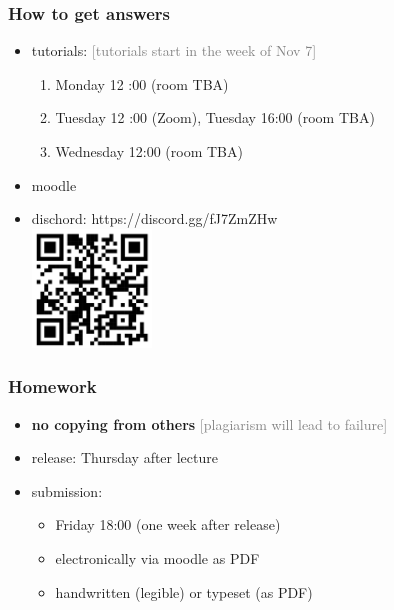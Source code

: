 \documentclass[fleqn,10pt,serif,xcolor=svgnames,xcolor=table,aspectratio=169,handout]{beamer}
\newcommand{\mycom}[1]{\hfill {\mygray{[#1]}}}
\newcommand{\mygray}[1]{\textcolor{gray}{#1}}
\begin{document}
\begin{frame}
  \frametitle{How to get answers}
  \begin{itemize}
    \item tutorials: \hfill \mycom{tutorials start in the week of Nov 7}
    \begin{enumerate}
      \item {} Monday 12   :00 (room TBA)
      \item {}   Tuesday 12  :00 (Zoom), Tuesday 16:00 (room TBA)
      \item {}           Wednesday 12:00 (room TBA)
    \end{enumerate}
    \item moodle
    \item dischord: https://discord.gg/fJ7ZmZHw \\
    \includegraphics[width=0.25\textwidth]{00-introduction-pics/qr-code.png}
  \end{itemize}
\end{frame}

\begin{frame}
  \frametitle{Homework}
  \begin{itemize}
    \item \textbf{no copying from others} \hfill \mycom{plagiarism will lead to failure}
    \item release: Thursday after lecture
    \item submission:
    \begin{itemize}
      \item Friday 18:00 (one week after release)
      \item electronically via moodle as PDF
      \item handwritten (legible) or typeset (as PDF)
    \end{itemize}
  \end{itemize}
\end{frame}
\end{document}
